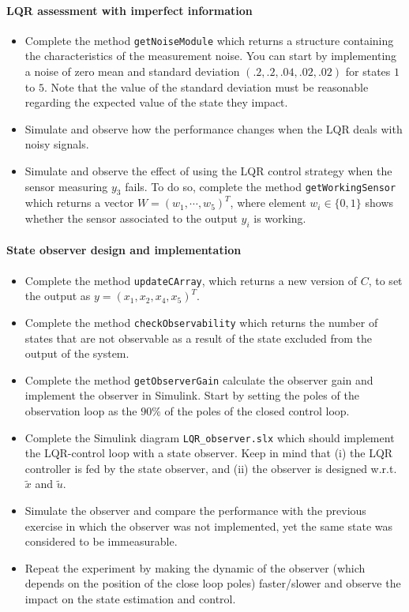 	\paragraph{LQR assessment with imperfect information}
	\begin{itemize}
		\item Complete the method \texttt{getNoiseModule} which returns a structure containing the characteristics of the measurement noise. 
		You can start by implementing a noise of zero mean and standard deviation $(.2, .2, .04, .02, .02)$ for states $1$ to $5$. 
		Note that the value of the standard deviation must be reasonable regarding the expected value of the state they impact.
		\item Simulate and observe how the performance changes when the LQR deals with noisy signals. 
		\item Simulate and observe the effect of using the LQR control strategy when the sensor measuring $y_3$ fails.
		To do so, complete the method \texttt{getWorkingSensor} which returns a vector %
		$W = (w_1,\cdots, w_5)^T$, where element %
		$w_i \in \lbrace0,1\rbrace$ %
		shows whether the sensor associated to the output %
		$y_i$ %
		is working.
	\end{itemize}
	\paragraph{State observer design and implementation}
	\begin{itemize}
		\item Complete the method \texttt{updateCArray}, which returns a new version of $C$, to set the output as %
		$y = (x_1, x_2, x_4, x_5)^T$.
		\item Complete the method \texttt{checkObservability} which returns the number of states that are not observable as a result of the state excluded from the output of the system. 
		\item Complete the method \texttt{getObserverGain} calculate the observer gain and implement the observer in Simulink. 
		Start by setting the poles of the observation loop as the %
		$90\%$ of the poles of the closed control loop. 
		\item Complete the Simulink diagram \texttt{LQR\_observer.slx} which should implement the LQR-control loop with a state observer. 
		Keep in mind that (i) the LQR controller is fed by the state observer, and (ii) the observer is designed w.r.t. $\tilde{x}$ and $\tilde{u}$.
		\item Simulate the observer and compare the performance with the previous exercise in which the observer was not implemented, yet the same state was considered to be immeasurable. 
		\item Repeat the experiment by making the dynamic of the observer (which depends on the position of the close loop poles) faster/slower and observe the impact on the state estimation and control. 
	\end{itemize} 